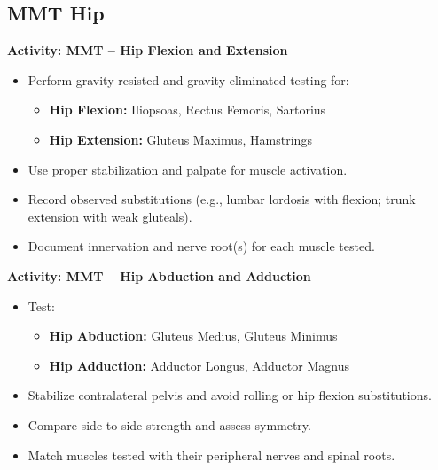 \subsection*{MMT Hip}

\begin{labactivitybox}
\textbf{Activity: MMT – Hip Flexion and Extension}

\begin{itemize}
  \item Perform gravity-resisted and gravity-eliminated testing for:
  \begin{itemize}
    \item \textbf{Hip Flexion:} Iliopsoas, Rectus Femoris, Sartorius
    \item \textbf{Hip Extension:} Gluteus Maximus, Hamstrings
  \end{itemize}
  \item Use proper stabilization and palpate for muscle activation.
  \item Record observed substitutions (e.g., lumbar lordosis with flexion; trunk extension with weak gluteals).
  \item Document innervation and nerve root(s) for each muscle tested.
\end{itemize}
\end{labactivitybox}

\begin{labactivitybox}
\textbf{Activity: MMT – Hip Abduction and Adduction}

\begin{itemize}
  \item Test:
  \begin{itemize}
    \item \textbf{Hip Abduction:} Gluteus Medius, Gluteus Minimus
    \item \textbf{Hip Adduction:} Adductor Longus, Adductor Magnus
  \end{itemize}
  \item Stabilize contralateral pelvis and avoid rolling or hip flexion substitutions.
  \item Compare side-to-side strength and assess symmetry.
  \item Match muscles tested with their peripheral nerves and spinal roots.
\end{itemize}
\end{labactivitybox}

